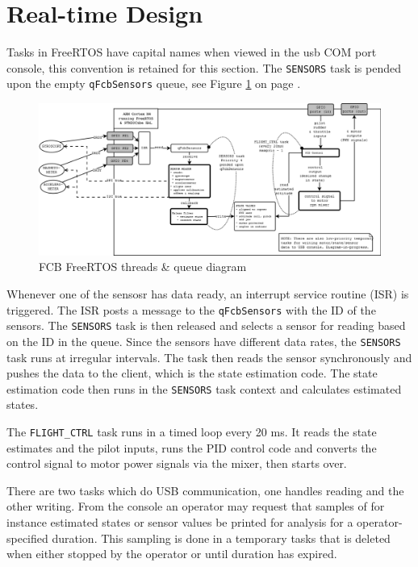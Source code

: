 \documentclass[a4paper]{report}
\begin{document}
	\section{Real-time Design}
	\label{sec:real-time-design}
Tasks in FreeRTOS have capital names when viewed in the usb COM port console, this convention is retained for this section. The \texttt{SENSORS} task is pended upon the empty \texttt{qFcbSensors} queue, see Figure \ref{fig:freertos-threads-queues-diag} on page \pageref{fig:freertos-threads-queues-diag}. 
\begin{figure}[h]
    \centering
    \includegraphics[scale=0.29]{images/FcbThreadsOverview.png}
    \caption{FCB FreeRTOS threads \& queue diagram}
    \label{fig:freertos-threads-queues-diag}
\end{figure}
Whenever one of the sensosr has data ready, an interrupt service routine (ISR) is triggered. The ISR posts a message to the \texttt{qFcbSensors} with the ID of the sensors. The \texttt{SENSORS} task is then released and selects a sensor for reading based on the ID in the queue. Since the sensors have different data rates, the \texttt{SENSORS} task runs at irregular intervals. The task then reads the sensor synchronously and pushes the data to the client, which is the state estimation code. The state estimation code then runs in the \texttt{SENSORS} task context and calculates estimated states.

The \texttt{FLIGHT\_CTRL} task runs in a timed loop every 20 ms. It reads the state estimates and the pilot inputs, runs the PID control code and converts the control signal to motor power signals via the mixer, then starts over.

There are two tasks which do USB communication, one handles reading and the other writing. From the console an operator may request that samples of for instance estimated states or sensor values be printed for analysis for a operator-specified duration. This sampling is done in a temporary tasks that is deleted when either stopped by the operator or until duration has expired.
\end{document}
